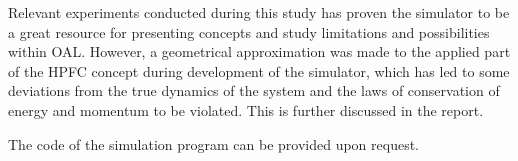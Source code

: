 Relevant experiments conducted during this study has proven the simulator to be a great resource for presenting concepts and study limitations and possibilities within OAL. However, a geometrical approximation was made to the applied part of the HPFC concept during development of the simulator, which has led to some deviations from the true dynamics of the system and the laws of conservation of energy and momentum to be violated. This is further discussed in the report.

The code of the simulation program can be provided upon request.


\makeatletter
{}


\makeatother







